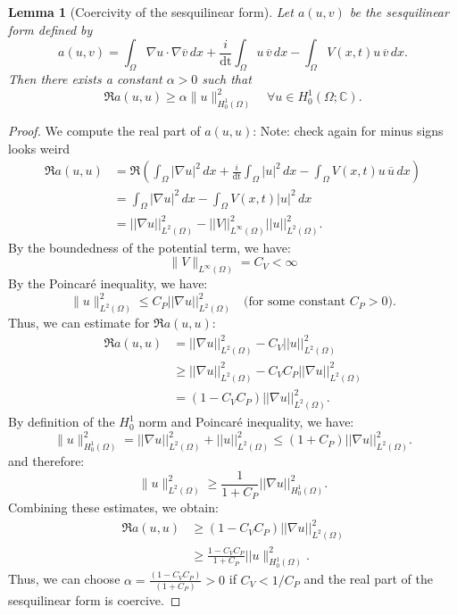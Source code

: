 \documentclass{article}
\theoremstyle{definition}
\theoremstyle{plain}
\newtheorem{lemma}[definition]{Lemma}
\theoremstyle{remark}
\newcommand{\dt}{\text{dt}}
\begin{document}
\begin{lemma}
[Coercivity of the sesquilinear form]
Let \( a(u, v) \) be the sesquilinear form defined by
\[
a(u, v) = \int_\Omega \nabla u \cdot \nabla \overline{v} \, dx + \frac{i}{\dt} \int_\Omega  u \, \overline{v} \, dx - \int_\Omega V(x,t) u \, \overline{v} \, dx.
\]
Then there exists a constant \( \alpha > 0 \) such that
\[
\Re a(u, u) \geq \alpha \|u\|_{H_0^1(\Omega)}^2 \quad \forall u \in H_0^1(\Omega; \mathbb{C}).
\]
\end{lemma}
\begin{proof}
We compute the real part of $a(u,u)$:
Note: check again for minus signs looks weird
\begin{align*}
\Re a(u, u)
&= \Re \left( \int_\Omega |\nabla u|^2 \, dx + \frac{i}{\dt}\int_\Omega   |u|^2 \, dx - \int_\Omega V(x,t) u \, \overline{u} \, dx \right) \\
&=  \int_\Omega |\nabla u|^2 \, dx - \int_\Omega V(x,t) |u|^2 \, dx \\
&= ||\nabla u||_{L^2(\Omega)}^2 - ||V||_{L^\infty(\Omega)}^2 ||u||_{L^2(\Omega)}^2.
\end{align*}
By the boundedness of the potential term, we have:
\[ \|V\|_{L^\infty(\Omega)} = C_V < \infty\]
By the Poincaré inequality, we have:
\[
\|u\|_{L^2(\Omega)}^2 \leq C_P ||\nabla u||_{L^2(\Omega)}^2 \quad \text{(for some constant } C_P > 0\text{)}.
\]
Thus, we can estimate for $\Re a(u, u)$:
\begin{align*}
\Re a(u, u) &= ||\nabla u||_{L^2(\Omega)}^2 - C_V ||u||_{L^2(\Omega)}^2 \\
&\geq ||\nabla u||_{L^2(\Omega)}^2 - C_V C_P ||\nabla u||_{L^2(\Omega)}^2 \\
&= (1 - C_V C_P) ||\nabla u||_{L^2(\Omega)}^2.
\end{align*}
By definition of the \(H_0^1\) norm and Poincaré inequality, we have:
\[\|u\|_{H_0^1(\Omega)}^2 = ||\nabla u||_{L^2(\Omega)}^2 + ||u||_{L^2(\Omega)}^2 \leq (1+C_P) ||\nabla u||_{L^2(\Omega)}^2.\]
and therefore:
\[\|u\|_{L^2(\Omega)}^2 \geq \frac{1}{1 + C_P} ||\nabla u||_{H_0^1(\Omega)}^2.\]
Combining these estimates, we obtain:
\begin{align*}
\Re a(u, u) &\geq (1 - C_V C_P) ||\nabla u||_{L^2(\Omega)}^2 \\
&\geq  \frac{1 - C_V C_P}{1 + C_P} ||u\|_{H_0^1(\Omega)}^2.
\end{align*}
Thus, we can choose \( \alpha = \frac{(1 - C_V C_P)}{(1 + C_P)} > 0 \) if \( C_V < 1/C_P \) and the real part of the sesquilinear form is coercive.


\end{proof}
\end{document}
